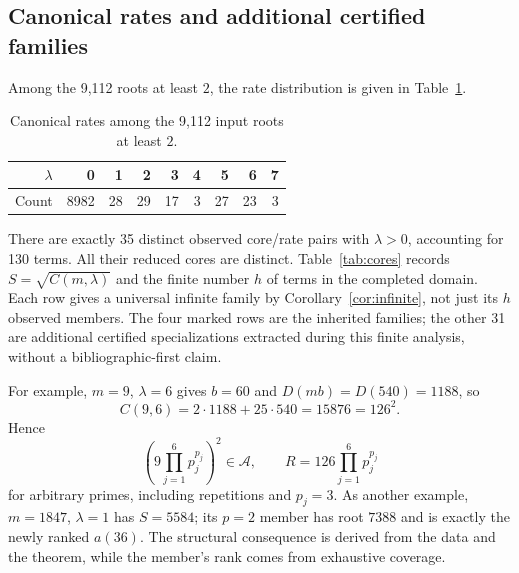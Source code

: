 \documentclass[11pt]{article}
\theoremstyle{definition}
\theoremstyle{remark}
\begin{document}
\subsection{Canonical rates and additional certified families}
Among the 9,112 roots at least $2$, the rate distribution is given in
Table~\ref{tab:rates}.
\begin{table}[htbp]
\centering
\caption{Canonical rates among the 9,112 input roots at least $2$.}
\label{tab:rates}
\begin{tabular}{rrrrrrrrr}
\toprule
$\lambda$&0&1&2&3&4&5&6&7\\
\midrule
Count&8982&28&29&17&3&27&23&3\\
\bottomrule
\end{tabular}
\end{table}
There are exactly 35 distinct observed core/rate pairs with
$\lambda>0$, accounting for 130 terms. All their reduced cores
are distinct. Table~\ref{tab:cores} records $S=\sqrt{C(m,\lambda)}$
and the finite number $h$ of terms in the completed domain.
Each row gives a universal infinite family by
Corollary~\ref{cor:infinite}, not just its $h$ observed members.
The four marked rows are the inherited families; the other 31 are
additional certified specializations extracted during this finite
analysis, without a bibliographic-first claim.

For example, $m=9$, $\lambda=6$ gives $b=60$ and $D(mb)=D(540)=1188$,
so
\[
 C(9,6)=2\cdot1188+25\cdot540=15876=126^{2}.
\]
Hence
\[
 \left(9\prod_{j=1}^{6}p_j^{p_j}\right)^{2}\in\mathcal A,
 \qquad R=126\prod_{j=1}^{6}p_j^{p_j}
\]
for arbitrary primes, including repetitions and $p_j=3$.
As another example, $m=1847$, $\lambda=1$ has $S=5584$;
its $p=2$ member has root $7388$ and is exactly the newly ranked
$a(36)$. The structural consequence is derived from the data and
the theorem, while the member's rank comes from exhaustive coverage.
\end{document}
